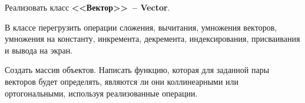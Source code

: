
Реализовать класс \textbf{<<Вектор>>~-- Vector}.

В классе перегрузить операции сложения, вычитания, умножения
векторов, умножения на константу, инкремента, декремента, индексирования,
присваивания и вывода на экран.

Создать массив объектов. Написать функцию, которая
для заданной пары векторов будет определять, являются ли они коллинеарными или
ортогональными, используя реализованные операции.
